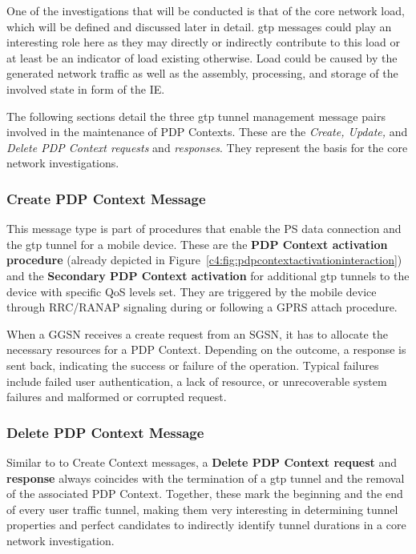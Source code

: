 One of the investigations that will be conducted is that of the core network load, which will be defined and discussed later in detail. \gls{gtp} messages could play an interesting role here as they may directly or indirectly contribute to this load or at least be an indicator of load existing otherwise. Load could be caused by the generated network traffic as well as the assembly, processing, and storage of the involved state in form of the \gls{IE}.

The following sections detail the three \gls{gtp} tunnel management message pairs involved in the maintenance of \gls{PDP} Contexts. These are the \textit{Create, Update,} and \textit{Delete \gls{PDP} Context requests} and \textit{responses}. They represent the basis for the core network investigations.


\subsubsection{Create \gls{PDP} Context Message}

This message type is part of procedures that enable the \gls{PS} data connection and the \gls{gtp} tunnel for a mobile device. These are the \textbf{\gls{PDP} Context activation procedure} (already depicted in Figure~\ref{c4:fig:pdpcontextactivationinteraction}) and the \textbf{Secondary \gls{PDP} Context activation} for additional \gls{gtp} tunnels to the device with specific \gls{QoS} levels set. They are triggered by the mobile device through \gls{RRC}/\gls{RANAP} signaling during or following a \gls{GPRS} attach procedure.

When a \gls{GGSN} receives a create request from an \gls{SGSN}, it has to allocate the necessary resources for a \gls{PDP} Context. Depending on the outcome, a response is sent back, indicating the success or failure of the operation. Typical failures include failed user authentication, a lack of resource, or unrecoverable system failures and malformed or corrupted request.


\subsubsection{Delete \gls{PDP} Context Message}

Similar to to Create Context messages, a \textbf{Delete \gls{PDP} Context request} and \textbf{response} always coincides with the termination of a \gls{gtp} tunnel and the removal of the associated \gls{PDP} Context. Together, these mark the beginning and the end of every user traffic tunnel, making them very interesting in determining tunnel properties and perfect candidates to indirectly identify tunnel durations in a core network investigation.

